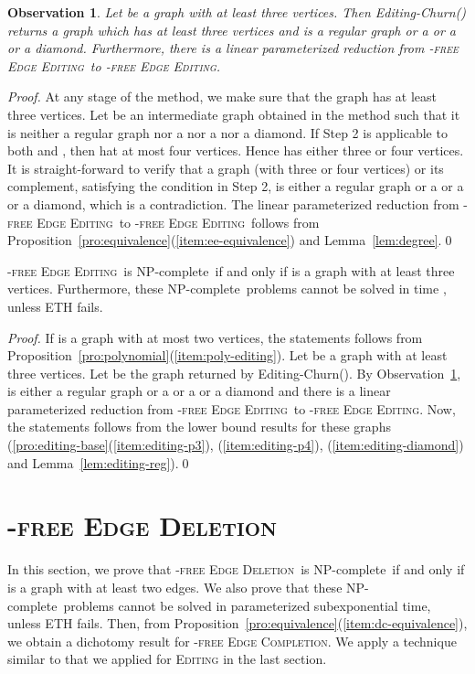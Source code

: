 \documentclass[envcountsame,envcountsect,10pt,oribibl]{llncs}
\newcommand{\pname}[1]{\textnormal{\textsc{#1}}}
\newcommand{\cclass}[1]{\textnormal{\textsf{#1}}}
\newcommand{\HED}{\pname{-free Edge Deletion}}
\newcommand{\HEC}{\pname{-free Edge Completion}}
\newcommand{\HEE}{\pname{-free Edge Editing}}
\newcommand{\HDEE}{\pname{-free Edge Editing}}
\newcommand{\NPC}{\cclass{NP-complete}}
\newtheorem{observation}[lemma]{Observation}
\begin{document}
\begin{observation}
  \label{obs:editing-churn}
  Let  be a graph with at least three vertices.
  Then Editing-Churn() returns a graph  which has
  at least three vertices and is a regular graph or a  or a 
  or a diamond. Furthermore, there is a linear parameterized reduction
  from \HDEE\ to \HEE.
\end{observation}
\begin{proof}
  At any stage of the method, we make sure that the graph has at least three vertices. 
  Let  be an intermediate graph obtained in the method such that it is neither a regular graph
  nor a  nor a  nor a diamond. If Step 2 is applicable to both  and ,
  then  hat at most four vertices. Hence  has either three or four vertices. 
  It is straight-forward to verify that a graph (with three or four vertices) or its complement,
  satisfying the condition in Step 2,
  is either a regular graph or a  or a  or a diamond, which is a contradiction.
  The linear parameterized reduction from \HDEE\ to \HEE\ follows from
  Proposition~\ref{pro:equivalence}(\ref{item:ee-equivalence}) and Lemma~\ref{lem:degree}.\qed
\end{proof}

\begin{theorem}
  \label{thm:editing}
  \HEE\ is \NPC\ if and only if  is a graph with 
  at least three vertices. Furthermore, these \NPC\
  problems cannot be solved in time , unless ETH fails.
\end{theorem}
\begin{proof}
  If  is a graph with at most two vertices, 
  the statements follows from Proposition~\ref{pro:polynomial}(\ref{item:poly-editing}).
  Let  be a graph with at least three vertices.
  Let  be the graph returned by Editing-Churn().
  By Observation~\ref{obs:editing-churn},  is either a regular graph or a 
  or a  or a diamond and there is a linear parameterized reduction from
  \HDEE\ to \HEE.
  Now, the statements follows from the lower bound results for these graphs 
  (\ref{pro:editing-base}(\ref{item:editing-p3}), (\ref{item:editing-p4}), (\ref{item:editing-diamond}) and
  Lemma~\ref{lem:editing-reg}).\qed
\end{proof}
\section{\HED}
\label{sec:deletion}

In this section, we prove that
\HED\ is \NPC\ if and only if  is a graph with 
at least two edges. We also prove that
these \NPC\ problems cannot be solved in parameterized subexponential time,
unless ETH fails. Then, from Proposition~\ref{pro:equivalence}(\ref{item:dc-equivalence}), we
obtain a dichotomy result for \HEC. We apply a technique similar to that we 
applied for \textsc{Editing} in the last section. 
\end{document}
